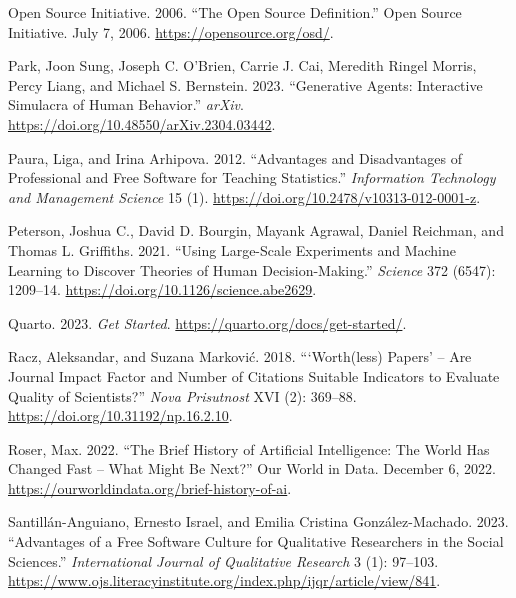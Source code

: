 \documentclass[
  letterpaper,
]{scrbook}
\newlength{\cslhangindent}
\newlength{\cslentryspacingunit} %
\newenvironment{CSLReferences}[2] %
 {%
  \setlength{\parindent}{0pt}
  \ifodd #1
  \let\oldpar\par
  \def\par{\hangindent=\cslhangindent\oldpar}
  \fi
  \setlength{\parskip}{#2\cslentryspacingunit}
 }%
 {}
\begin{document}
\begin{CSLReferences}{1}{0}
\leavevmode{}%
Open Source Initiative. 2006. {``The {Open Source Definition}.''} Open
Source Initiative. July 7, 2006. \url{https://opensource.org/osd/}.

\leavevmode{}%
Park, Joon Sung, Joseph C. O'Brien, Carrie J. Cai, Meredith Ringel
Morris, Percy Liang, and Michael S. Bernstein. 2023. {``Generative
{Agents}: {Interactive Simulacra} of {Human Behavior}.''} \emph{arXiv}.
\url{https://doi.org/10.48550/arXiv.2304.03442}.

\leavevmode{}%
Paura, Liga, and Irina Arhipova. 2012. {``Advantages and {Disadvantages}
of {Professional} and {Free Software} for {Teaching Statistics}.''}
\emph{Information Technology and Management Science} 15 (1).
\url{https://doi.org/10.2478/v10313-012-0001-z}.

\leavevmode{}%
Peterson, Joshua C., David D. Bourgin, Mayank Agrawal, Daniel Reichman,
and Thomas L. Griffiths. 2021. {``Using {Large-Scale Experiments} and
{Machine Learning} to {Discover Theories} of {Human Decision-Making}.''}
\emph{Science} 372 (6547): 1209--14.
\url{https://doi.org/10.1126/science.abe2629}.

\leavevmode{}%
Quarto. 2023. \emph{Get {Started}}.
\url{https://quarto.org/docs/get-started/}.

\leavevmode{}%
Racz, Aleksandar, and Suzana Marković. 2018. {``{`{Worth}(less) Papers'}
-- Are Journal Impact Factor and Number of Citations Suitable Indicators
to Evaluate Quality of Scientists?''} \emph{Nova Prisutnost} XVI (2):
369--88. \url{https://doi.org/10.31192/np.16.2.10}.

\leavevmode{}%
Roser, Max. 2022. {``The {Brief History} of {Artificial Intelligence}:
{The World Has Changed Fast} -- {What Might Be Next}?''} Our World in
Data. December 6, 2022.
\url{https://ourworldindata.org/brief-history-of-ai}.

\leavevmode{}%
Santillán-Anguiano, Ernesto Israel, and Emilia Cristina
González-Machado. 2023. {``Advantages of a {Free Software Culture} for
{Qualitative Researchers} in the {Social Sciences}.''}
\emph{International Journal of Qualitative Research} 3 (1): 97--103.
\url{https://www.ojs.literacyinstitute.org/index.php/ijqr/article/view/841}.


\end{CSLReferences}
\end{document}
